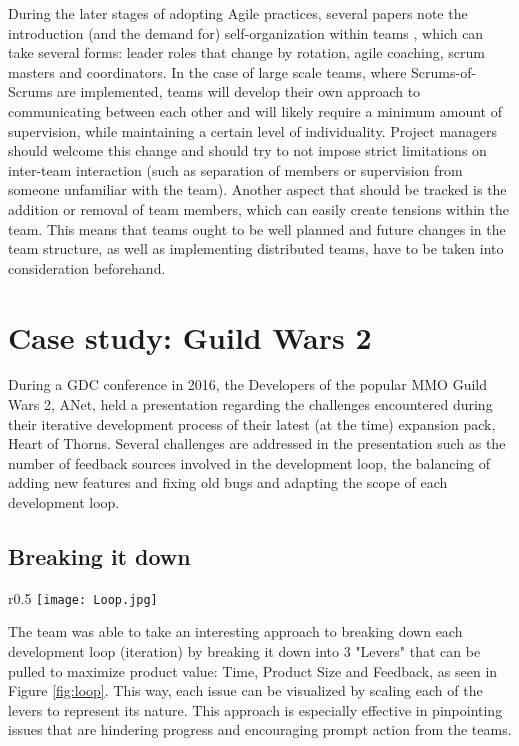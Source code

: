 \documentclass{scrartcl}
\begin{document}
    During the later stages of adopting Agile practices, several papers note the introduction (and the demand for) self-organization within teams \cite{4599458, 4599456, 6986022, 8064437, 6475422}, which can take several forms: leader roles that change by rotation, agile coaching, scrum masters and coordinators. In the case of large scale teams, where Scrums-of-Scrums are implemented, teams will develop their own approach to communicating between each other and will likely require a minimum amount of supervision, while maintaining a certain level of individuality. Project managers should welcome this change and should try to not impose strict limitations on inter-team interaction (such as separation of members or supervision from someone unfamiliar with the team). Another aspect that should be tracked is the addition or removal of team members, which can easily create tensions within the team. This means that teams ought to be well planned and future changes in the team structure, as well as implementing distributed teams, have to be taken into consideration beforehand.
    
    \section{Case study: Guild Wars 2}
    
    During a GDC conference in 2016, the Developers of the popular MMO Guild Wars 2, ANet, held a presentation regarding the challenges encountered during their iterative development process of their latest (at the time) expansion pack, Heart of Thorns. Several challenges are addressed in the presentation such as the number of feedback sources involved in the development loop, the balancing of adding new features and fixing old bugs and adapting the scope of each development loop.
    
    \subsection{Breaking it down}
    
    \begin{wrapfigure}{r}{0.5\textwidth}
        \centering
        \texttt{[image: Loop.jpg]}
        \caption{the three levers}
        \label{fig:loop}
    \end{wrapfigure}
    
    The team was able to take an interesting approach to breaking down each development loop (iteration) by breaking it down into 3 "Levers" that can be pulled to maximize product value: Time, Product Size and Feedback, as seen in Figure \ref{fig:loop}. This way, each issue can be visualized by scaling each of the levers to represent its nature. This approach is especially effective in pinpointing issues that are hindering progress and encouraging prompt action from the teams.
    
\end{document}

